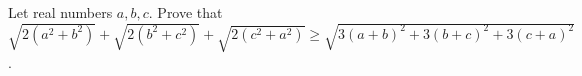 Let real numbers $ a,b,c$. Prove that $ \sqrt{2(a^2+b^2)}+\sqrt{2(b^2+c^2)}+\sqrt{2(c^2+a^2)}\ge \sqrt{3(a+b)^2+3(b+c)^2+3(c+a)^2}$.